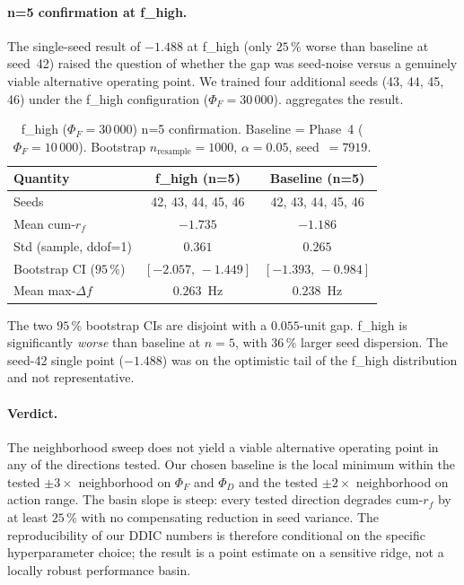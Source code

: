 \documentclass[journal,onecolumn,11pt]{IEEEtran}
\begin{document}
\paragraph{n=5 confirmation at f\_high.} The single-seed result of
$-1.488$ at f\_high (only $25\,\%$ worse than baseline at seed~42)
raised the question of whether the gap was seed-noise versus a
genuinely viable alternative operating point. We trained four
additional seeds (43, 44, 45, 46) under the f\_high configuration
($\Phi_F = 30\,000$).  aggregates the
result.

\begin{table}[!t]
  \centering
  \caption{f\_high ($\Phi_F = 30\,000$) n=5 confirmation. Baseline =
    Phase~4 ($\Phi_F = 10\,000$). Bootstrap $n_{\text{resample}} =
    1000$, $\alpha = 0.05$, seed~$=7919$.}
  \label{tab:hparam-fhigh-n5}
  \footnotesize
  \begin{tabular}{lcc}
    \toprule
    Quantity & f\_high (n=5) & Baseline (n=5) \\
    \midrule
    Seeds          & 42, 43, 44, 45, 46 & 42, 43, 44, 45, 46 \\
    Mean cum-$r_f$ & $-1.735$ & $-1.186$ \\
    Std (sample, ddof=1) & $0.361$ & $0.265$ \\
    Bootstrap CI ($95\,\%$) & $[-2.057,\, -1.449]$ & $[-1.393,\, -0.984]$ \\
    Mean max-$\Delta f$ & $0.263$~Hz & $0.238$~Hz \\
    \bottomrule
  \end{tabular}
\end{table}

The two $95\,\%$ bootstrap CIs are disjoint with a $0.055$-unit gap.
f\_high is significantly \emph{worse} than baseline at $n = 5$, with
$36\,\%$ larger seed dispersion. The seed-42 single point ($-1.488$)
was on the optimistic tail of the f\_high distribution and not
representative.

\paragraph{Verdict.} The neighborhood sweep does not yield a viable
alternative operating point in any of the directions tested. Our
chosen baseline is the local minimum within the tested $\pm 3\times$
neighborhood on $\Phi_F$ and $\Phi_D$ and the tested $\pm 2\times$
neighborhood on action range. The basin slope is steep: every tested
direction degrades cum-$r_f$ by at least $25\,\%$ with no compensating
reduction in seed variance. The reproducibility of our DDIC numbers
is therefore conditional on the specific hyperparameter choice; the
result is a point estimate on a sensitive ridge, not a locally robust
performance basin.
\end{document}
